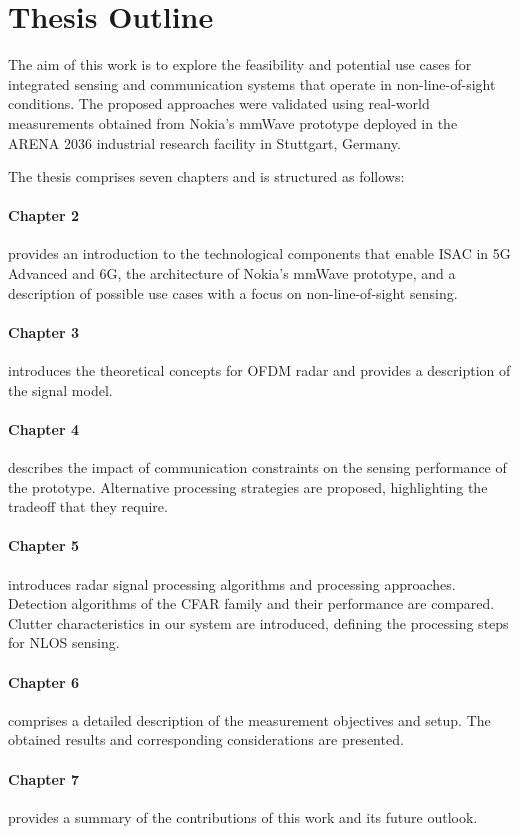 \section{Thesis Outline}

The aim of this work is to explore the feasibility and potential use cases for integrated sensing and communication systems that operate in non-line-of-sight conditions.
The proposed approaches were validated using real-world measurements obtained from Nokia's mmWave prototype deployed in the ARENA 2036 industrial research facility in Stuttgart, Germany.

The thesis comprises seven chapters and is structured as follows:

\paragraph{Chapter 2} provides an introduction to the technological components that enable ISAC in 5G Advanced and 6G, the architecture of Nokia's mmWave prototype, and a description of possible use cases with a focus on non-line-of-sight sensing.

\paragraph{Chapter 3} introduces the theoretical concepts for OFDM radar and provides a description of the signal model.

\paragraph{Chapter 4} describes the impact of communication constraints on the sensing performance of the prototype. Alternative processing strategies are proposed, highlighting the tradeoff that they require.

\paragraph{Chapter 5} introduces radar signal processing algorithms and processing approaches. Detection algorithms of the CFAR family and their performance are compared. Clutter characteristics in our system are introduced, defining the processing steps for NLOS sensing.

\paragraph{Chapter 6} comprises a detailed description of the measurement objectives and setup. The obtained results and corresponding considerations are presented.

\paragraph{Chapter 7} provides a summary of the contributions of this work and its future outlook.

